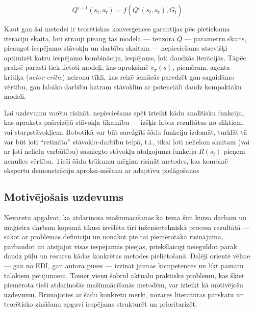 \documentclass[12pt, a4paper]{article}
\numberwithin{equation}{section} %
\begin{document}
\begin{equation}
    Q^{i+1}(s_t,a_t)=f(Q^{i}(s_t, a_t), G_t)
\end{equation}

Kaut gan šai metodei ir teorētiskas konverģences garantijas pēc pietiekama iterāciju skaita, ļoti strauji pieaug tās modeļa --- tenzora $Q$ --- parametru skaits, pieaugot iespējamo stāvokļu un darbību skaitam --- nepieciešams atsevišķi optimizēt katru iespējamo kombināciju, iespējams, ļoti daudzās iterācijās. Tāpēc praksē parasti tiek lietoti modeļi, kas aproksimē $v_{\pi}(s)$, piemēram, aģenta-kritiķa (\textit{actor-critic}) neironu tīkli, kas reizē iemācās paredzēt gan sagaidāmo vērtību, gan labāko darbību katram stāvoklim ar potenciāli daudz kompaktāku modeli.

Lai uzdevumu varētu risināt, nepieciešams spēt izteikt kādu analītisku funkciju, kas apraksta pašreizējā stāvokļa tīkamību --- izšķir labus rezultātus no sliktiem, vai starpstāvokļiem. Robotikā var būt sarežģīti šādu funkciju izdomāt, turklāt tā var būt ļoti ``retināta'' stāvokļu-darbību telpā, t.i., tikai ļoti nelielam skaitam (vai ar ļoti nelielu varbūtību) sasniegto stāvokļu atalgojuma funkcija $R(s_t)$ pieņem nenulles vērtību. Tieši šādu trūkumu mēģina risināt metodes, kas kombinē ekspertu demonstrāciju aproksi-mēšanu ar adaptīvu pielāgošanos \cite{nair2018overcoming}

\subsection{Motivējošais uzdevums}

Nevarētu apgalvot, ka atdarinosā mašīnmācīšanās kā tēma šim kursa darbam un maģistra darbam kopumā tikusi izvēlēta tīri inženiertehniskā procesa rezultātā --- sākot ar problēmas definīciju un nonākot pie tai piemērotākā risinājuma, pārbaudot un atsijājot visas iespējamās pieejas, priekšlaicīgi neieguldot pārāk daudz pūļu un resursu kādas konkrētas metodes pielietošanā. Daļēji orientē vēlme --- gan no EDI, gan autora puses --- izzināt jaunas kompetences un likt pamatu tālākiem pētījumiem. Tomēr vienu šobrīd aktuālu praktisku problēmu, kas šķiet piemērota tieši atdarinošās mašīnmācīšanās metodēm, var izteikt kā motivējošu uzdevumu. Bruņojoties ar šādu konkrētu mērķi, nozares literatūras pārskatu un teorētisko zināšanu apguvi iespējams strukturēt un prioritarizēt.
\end{document}
